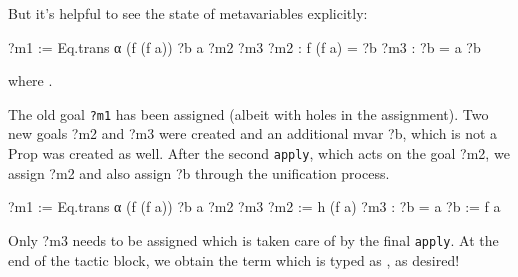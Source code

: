 But it's helpful to see the state of metavariables explicitly:

\begin{leancode}
?m1 := Eq.trans α (f (f a)) ?b a ?m2 ?m3
?m2 : f (f a) = ?b
?m3 : ?b = a
?b 
\end{leancode}

where
 .

The old goal \texttt{?m1} has been assigned (albeit with holes in the assignment). Two new goals ?m2 and ?m3 were created and an additional mvar ?b,
which is not a Prop was created as well. After the second \texttt{apply}, which acts on the goal ?m2, we assign ?m2 and also assign ?b through the unification process.

\begin{leancode}
?m1 := Eq.trans α (f (f a)) ?b a ?m2 ?m3
?m2 := h (f a)
?m3 : ?b = a
?b  := f a
\end{leancode}
Only ?m3 needs to be assigned which is taken care of by the final \texttt{apply}. At the end of the tactic block, we obtain the term
 which is typed as , as desired!
